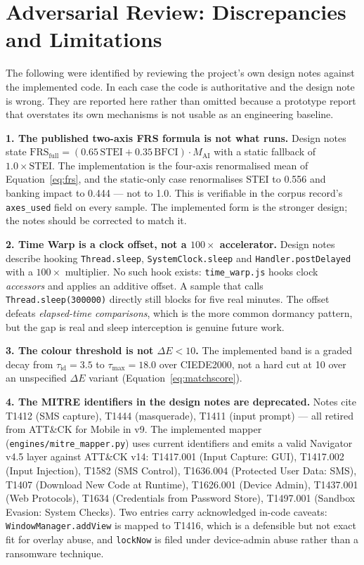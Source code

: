 \documentclass{article}
\begin{document}
\section{Adversarial Review: Discrepancies and Limitations}
\label{sec:limits}

The following were identified by reviewing the project's own design notes
against the implemented code. In each case the code is authoritative and the
design note is wrong. They are reported here rather than omitted because a
prototype report that overstates its own mechanisms is not usable as an
engineering baseline.

\textbf{1. The published two-axis FRS formula is not what runs.} Design notes
state $\mathrm{FRS}_{\mathrm{full}} = (0.65\,\mathrm{STEI} +
0.35\,\mathrm{BFCI}) \cdot M_{\mathrm{AI}}$ with a static fallback of
$1.0 \times \mathrm{STEI}$. The implementation is the four-axis renormalised
mean of Equation~\ref{eq:frs}, and the static-only case renormalises STEI to
0.556 and banking impact to 0.444 --- not to 1.0. This is verifiable in the
corpus record's \texttt{axes\_used} field on every sample. The implemented form
is the stronger design; the notes should be corrected to match it.

\textbf{2. Time Warp is a clock offset, not a $100\times$ accelerator.} Design
notes describe hooking \texttt{Thread.sleep}, \texttt{SystemClock.sleep} and
\texttt{Handler.postDelayed} with a $100\times$ multiplier. No such hook exists:
\texttt{time\_warp.js} hooks clock \emph{accessors} and applies an additive
offset. A sample that calls \texttt{Thread.sleep(300000)} directly still blocks
for five real minutes. The offset defeats \emph{elapsed-time comparisons}, which
is the more common dormancy pattern, but the gap is real and sleep interception
is genuine future work.

\textbf{3. The colour threshold is not $\Delta E < 10$.} The implemented band is
a graded decay from $\tau_{\mathrm{id}} = 3.5$ to $\tau_{\max} = 18.0$ over
CIEDE2000, not a hard cut at 10 over an unspecified $\Delta E$ variant
(Equation~\ref{eq:matchscore}).

\textbf{4. The MITRE identifiers in the design notes are deprecated.} Notes cite
T1412 (SMS capture), T1444 (masquerade), T1411 (input prompt) --- all retired
from ATT\&CK for Mobile in v9. The implemented mapper
(\texttt{engines/mitre\_mapper.py}) uses current identifiers and emits a valid
Navigator v4.5 layer against ATT\&CK v14: T1417.001 (Input Capture: GUI),
T1417.002 (Input Injection), T1582 (SMS Control), T1636.004 (Protected User
Data: SMS), T1407 (Download New Code at Runtime), T1626.001 (Device Admin),
T1437.001 (Web Protocols), T1634 (Credentials from Password Store), T1497.001
(Sandbox Evasion: System Checks). Two entries carry acknowledged
in-code caveats: \texttt{WindowManager.addView} is mapped to T1416, which is a
defensible but not exact fit for overlay abuse, and \texttt{lockNow} is filed
under device-admin abuse rather than a ransomware technique.
\end{document}
